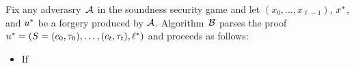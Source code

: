 \newcommand{\ellstar}{\ell^*}

Fix any adverasry~$\mathcal{A}$ in the soundness security game and let $(x_0,
\ldots, x_{\ell-1})$, $x^*$, and $u^*$ be a forgery produced by $\mathcal{A}$.
Algorithm~$\mathcal{B}$ parses the proof $\ustar = (S = (c_0, \tau_0), \ldots, (c_t,
\tau_t), \ellstar)$ and proceeds as follows:
\begin{itemize}
  \item If 
\end{itemize}

